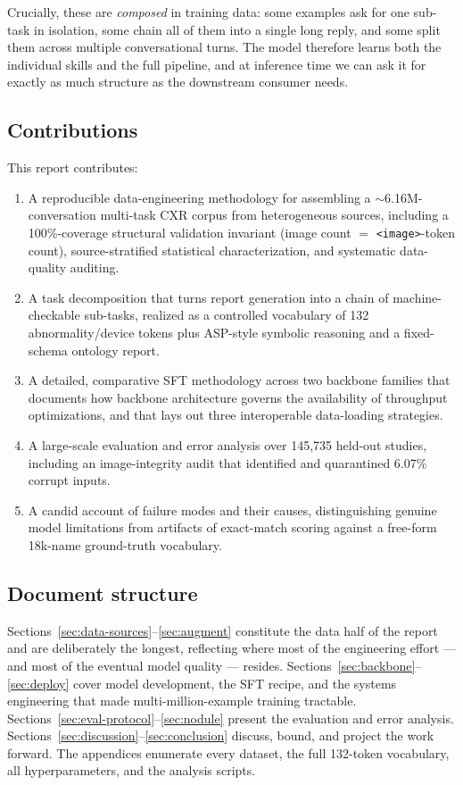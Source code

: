 \documentclass[11pt,a4paper]{article}
\begin{document}
Crucially, these are \emph{composed} in training data: some examples ask for one sub-task in isolation, some chain all of them into a single long reply, and some split them across multiple conversational turns. The model therefore learns both the individual skills and the full pipeline, and at inference time we can ask it for exactly as much structure as the downstream consumer needs.

\subsection{Contributions}
This report contributes:
\begin{enumerate}[leftmargin=1.6em]
  \item A reproducible data-engineering methodology for assembling a $\sim$6.16M-conversation multi-task CXR corpus from heterogeneous sources, including a 100\%-coverage structural validation invariant (image count $=$ \texttt{<image>}-token count), source-stratified statistical characterization, and systematic data-quality auditing.
  \item A task decomposition that turns report generation into a chain of machine-checkable sub-tasks, realized as a controlled vocabulary of 132 abnormality/device tokens plus ASP-style symbolic reasoning and a fixed-schema ontology report.
  \item A detailed, comparative SFT methodology across two backbone families that documents how backbone architecture governs the availability of throughput optimizations, and that lays out three interoperable data-loading strategies.
  \item A large-scale evaluation and error analysis over 145{,}735 held-out studies, including an image-integrity audit that identified and quarantined 6.07\% corrupt inputs.
  \item A candid account of failure modes and their causes, distinguishing genuine model limitations from artifacts of exact-match scoring against a free-form 18k-name ground-truth vocabulary.
\end{enumerate}

\subsection{Document structure}
Sections~\ref{sec:data-sources}--\ref{sec:augment} constitute the data half of the report and are deliberately the longest, reflecting where most of the engineering effort --- and most of the eventual model quality --- resides. Sections~\ref{sec:backbone}--\ref{sec:deploy} cover model development, the SFT recipe, and the systems engineering that made multi-million-example training tractable. Sections~\ref{sec:eval-protocol}--\ref{sec:nodule} present the evaluation and error analysis. Sections~\ref{sec:discussion}--\ref{sec:conclusion} discuss, bound, and project the work forward. The appendices enumerate every dataset, the full 132-token vocabulary, all hyperparameters, and the analysis scripts.
\end{document}
